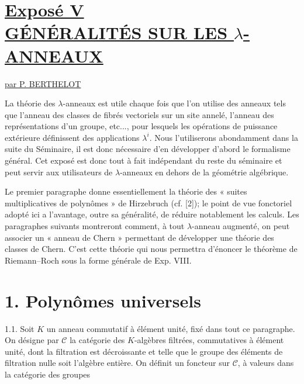 
\renewcommand{\parf}{\operatorname{parf}}
\section*{\underline{Exposé V}\\[3pt] \underline{\underline{GÉNÉRALITÉS SUR LES \(\lambda\)-ANNEAUX}}}
\begin{center}
\underline{par P. BERTHELOT}
\end{center}

La théorie des \(\lambda\)-anneaux est utile chaque fois que l'on utilise des anneaux tels que l'anneau des classes de fibrés vectoriels sur un site annelé, l'anneau des représentations d'un groupe, etc..., pour lesquels les opérations de puissance extérieure définissent des applications \(\lambda^i\). Nous l'utiliserons abondamment dans la suite du Séminaire, il est donc nécessaire d'en développer d'abord le formalisme général. Cet exposé est donc tout à fait indépendant du reste du séminaire et peut servir aux utilisateurs de \(\lambda\)-anneaux en dehors de la géométrie algébrique.

Le premier paragraphe donne essentiellement la théorie des « suites multiplicatives de polynômes » de Hirzebruch (cf. [2]); le point de vue fonctoriel adopté ici a l'avantage, outre sa généralité, de réduire notablement les calculs. Les paragraphes suivants montreront comment, à tout \(\lambda\)-anneau augmenté, on peut associer un « anneau de Chern » permettant de développer une théorie des classes de Chern. C'est cette théorie qui nous permettra d'énoncer le théorème de Riemann--Roch sous la forme générale de Exp. VIII.

\section*{1. Polynômes universels}

1.1. Soit \(K\) un anneau commutatif à élément unité, fixé dans tout ce paragraphe. On désigne par \(\mathcal C\) la catégorie des \(K\)-algèbres filtrées, commutatives à élément unité, dont la filtration est décroissante et telle que le groupe des éléments de filtration nulle soit l'algèbre entière. On définit un foncteur sur \(\mathcal C\), à valeurs dans la catégorie des groupes 

